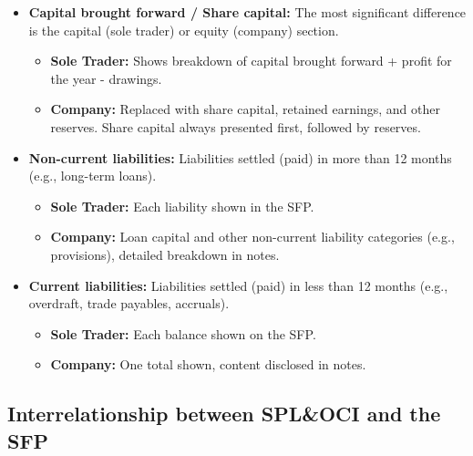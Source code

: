 \begin{itemize}
\begin{itemize}
    \end{itemize}
    \item \textbf{Capital brought forward / Share capital:} The most significant difference is the capital (sole trader) or equity (company) section.
    \begin{itemize}
        \item \textbf{Sole Trader:} Shows breakdown of capital brought forward + profit for the year - drawings.
        \item \textbf{Company:} Replaced with share capital, retained earnings, and other reserves. Share capital always presented first, followed by reserves.
    \end{itemize}
    \item \textbf{Non-current liabilities:} Liabilities settled (paid) in more than 12 months (e.g., long-term loans).
    \begin{itemize}
        \item \textbf{Sole Trader:} Each liability shown in the SFP.
        \item \textbf{Company:} Loan capital and other non-current liability categories (e.g., provisions), detailed breakdown in notes.
    \end{itemize}
    \item \textbf{Current liabilities:} Liabilities settled (paid) in less than 12 months (e.g., overdraft, trade payables, accruals).
    \begin{itemize}
        \item \textbf{Sole Trader:} Each balance shown on the SFP.
        \item \textbf{Company:} One total shown, content disclosed in notes.
    \end{itemize}
\end{itemize}

\subsection{Interrelationship between SPL\&OCI and the SFP}


